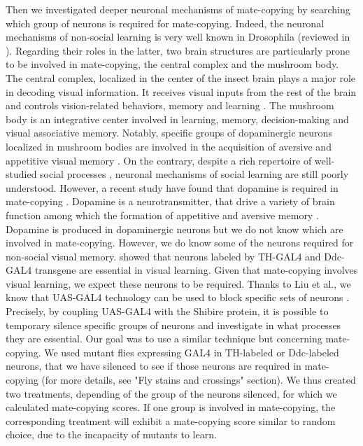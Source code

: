 \documentclass[a4paper, 12pt]{article}
\begin{document}
	Then we investigated deeper neuronal mechanisms of mate-copying by searching which group of neurons is required for mate-copying. 
	Indeed, the neuronal mechanisms of non-social learning is very well known in Drosophila (reviewed in \textcite{cognigni_right_2018}).
	Regarding their roles in the latter, two brain structures are particularly prone to be involved in mate-copying, the central complex and the mushroom body.
	The central complex, localized in the center of the insect brain plays a major role in decoding visual information.
	It receives visual inputs from the rest of the brain and controls vision-related behaviors, memory and learning \parencite{guo_vision_2017}.
	The mushroom body is an integrative center involved in learning, memory, decision-making  and visual associative memory.
	Notably, specific groups of dopaminergic neurons localized in mushroom bodies are involved in the acquisition of aversive and appetitive visual  memory \parencite{liu_subset_2012, vogt_shared_2014}. 
	On the contrary, despite a rich repertoire of well-studied social processes \parencite{pasquaretta_how_2016, teseo_fighting_2016, dawson_social_2018}, neuronal mechanisms of social learning are still poorly understood. 
	However, a recent study have found that dopamine is required in mate-copying \parencite{monier_dopamine_2018}.
	Dopamine is a neurotransmitter, that drive a  variety of brain function among which the formation of appetitive and aversive memory \parencite{riemensperger_punishment_2005,sitaraman_serotonin_2008,alekseyenko_targeted_2010,berry_dopamine_2012,yamamoto_dopamine_2014}. Dopamine is produced in dopaminergic neurons but we do not know which are involved in mate-copying. 
	However, we do know some of the neurons required for non-social visual memory.
	\textcite{vogt_shared_2014} showed that neurons labeled by TH-GAL4 and Ddc-GAL4 transgene are essential in visual learning. 
	Given that mate-copying involves visual learning, we expect these neurons to be required.
	Thanks to Liu et al., we know that UAS-GAL4 technology can be used to block specific sets of neurons \parencite{liu_subset_2012}. Precisely, by coupling UAS-GAL4 with the Shibire protein, it is possible to temporary silence specific groups of neurons and investigate in what processes they are essential. 
	Our goal was to use a similar technique but concerning mate-copying. We used mutant flies expressing GAL4 in TH-labeled or Ddc-labeled neurons, that we have silenced to see if those neurons are required in mate-copying (for more details, see "Fly stains and crossings" section). 
	We thus created two treatments, depending of the group of the neurons silenced, for which we calculated mate-copying scores. 
	If one group is involved in mate-copying, the corresponding treatment will exhibit a mate-copying score similar to random choice, due to the incapacity of mutants to learn.
	
\end{document}
